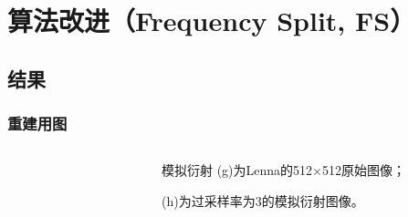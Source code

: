 \documentclass[12pt,aspectratio=169]{beamer} %
\begin{document}
\section{算法改进（Frequency Split, FS）}

\subsection{结果}

\begin{frame}
    \frametitle{重建用图}
    \begin{columns}
        \begin{column}{0.7\textwidth}
            \begin{figure}
                \qquad
            \end{figure}
        \end{column}
        \begin{column}{0.3\textwidth}
            \begin{block}{模拟衍射}
                (g)为Lenna的512$\times$512原始图像；

                (h)为过采样率为3的模拟衍射图像。
            \end{block}
        \end{column}
    \end{columns}
\end{frame}
\end{document}
